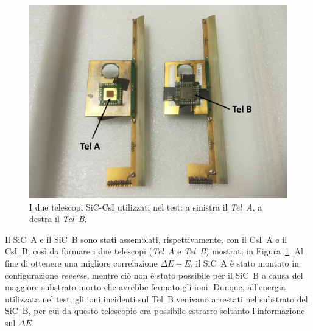 \begin{figure} [!t]
	\centering
	\includegraphics[width=\textwidth, keepaspectratio]{Grafici/telescopi_etichette.png}
	\caption{I due telescopi SiC-CsI utilizzati nel test: a sinistra il \emph{Tel~A}, a destra il \emph{Tel~B}.} \label{fig:telescopi}
\end{figure}






Il SiC~A e il SiC~B sono stati assemblati, rispettivamente, con il CsI~A e il CsI~B, così da formare i due telescopi (\emph{Tel~A} e \emph{Tel~B}) mostrati in Figura~\ref{fig:telescopi}.
Al fine di ottenere una migliore correlazione $\Delta E - E$, il SiC~A è stato montato in configurazione \emph{reverse}, mentre ciò non è stato possibile per il SiC~B a causa del maggiore substrato morto che avrebbe fermato gli ioni.
Dunque, all'energia utilizzata nel test, gli ioni incidenti sul Tel~B venivano arrestati nel substrato del SiC~B, per cui da questo telescopio era possibile estrarre soltanto l'informazione sul $\Delta E$.

